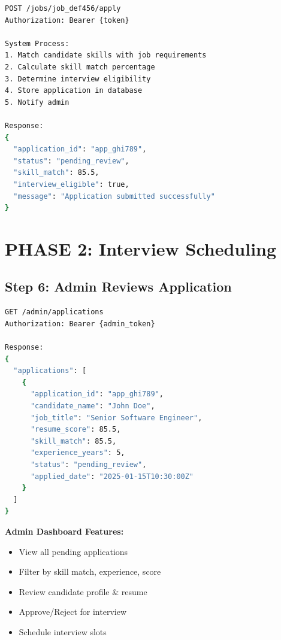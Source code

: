 \documentclass[12pt,a4paper]{article}
\begin{document}
\begin{lstlisting}[language=bash, caption=Job Application API]
POST /jobs/job_def456/apply
Authorization: Bearer {token}

System Process:
1. Match candidate skills with job requirements
2. Calculate skill match percentage
3. Determine interview eligibility
4. Store application in database
5. Notify admin

Response:
{
  "application_id": "app_ghi789",
  "status": "pending_review",
  "skill_match": 85.5,
  "interview_eligible": true,
  "message": "Application submitted successfully"
}
\end{lstlisting}

\newpage

\section{PHASE 2: Interview Scheduling}

\subsection{Step 6: Admin Reviews Application}

\begin{lstlisting}[language=bash, caption=Admin Application Review]
GET /admin/applications
Authorization: Bearer {admin_token}

Response:
{
  "applications": [
    {
      "application_id": "app_ghi789",
      "candidate_name": "John Doe",
      "job_title": "Senior Software Engineer",
      "resume_score": 85.5,
      "skill_match": 85.5,
      "experience_years": 5,
      "status": "pending_review",
      "applied_date": "2025-01-15T10:30:00Z"
    }
  ]
}
\end{lstlisting}

\textbf{Admin Dashboard Features:}
\begin{itemize}
    \item View all pending applications
    \item Filter by skill match, experience, score
    \item Review candidate profile \& resume
    \item Approve/Reject for interview
    \item Schedule interview slots
\end{itemize}
\end{document}
